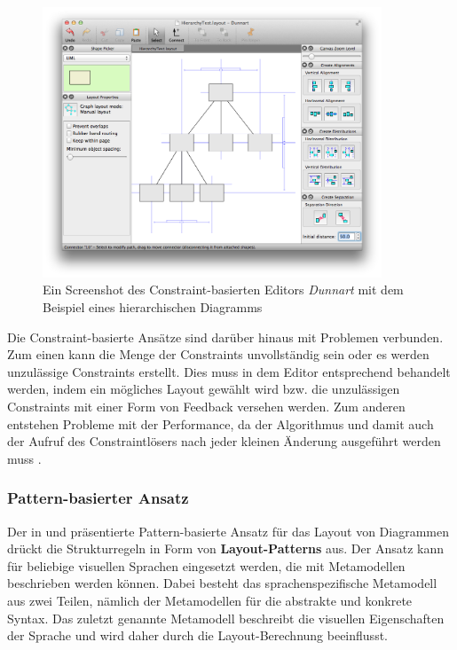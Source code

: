 \begin{figure}[hbt]
    \centering
    \includegraphics[width=0.9\textwidth]{resources/dunnart-screenshot}
    \caption{Ein Screenshot des Constraint-basierten Editors \textit{Dunnart} mit dem Beispiel eines hierarchischen Diagramms}
    \label{fig:dunnart-screenshot}
\end{figure}

Die Constraint-basierte Ansätze sind darüber hinaus mit Problemen verbunden. Zum einen kann die Menge der Constraints unvollständig sein oder es werden unzulässige Constraints erstellt. Dies muss in dem Editor entsprechend behandelt werden, indem ein mögliches Layout gewählt wird bzw. die unzulässigen Constraints mit einer Form von Feedback versehen werden. Zum anderen entstehen Probleme mit der Performance, da der Algorithmus und damit auch der Aufruf des Constraintlösers  nach jeder kleinen Änderung ausgeführt werden muss \cite{Maier12A-Pattern-based}.

\subsubsection{Pattern-basierter Ansatz}
\label{subsubsec:pattern-based-approach}

Der in \cite{Maier12A-Pattern-based} und \cite{MaierMinas10Combination} präsentierte Pattern-basierte Ansatz für das Layout von Diagrammen drückt die Strukturregeln in Form von \textbf{Layout-Patterns} aus. Der Ansatz kann für beliebige visuellen Sprachen eingesetzt werden, die mit Metamodellen beschrieben werden können. Dabei besteht das sprachenspezifische Metamodell aus zwei Teilen, nämlich der Metamodellen für die abstrakte und konkrete Syntax. Das zuletzt genannte Metamodell beschreibt die visuellen Eigenschaften der Sprache und wird daher durch die Layout-Berechnung beeinflusst.

